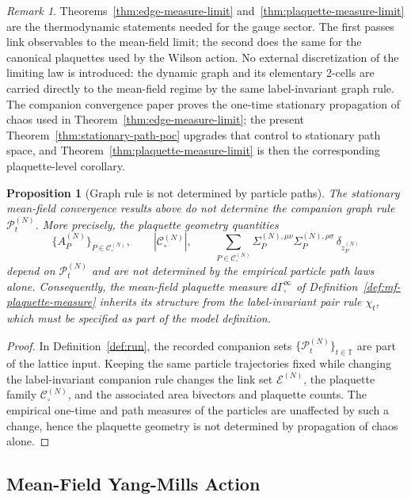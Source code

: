 \documentclass[11pt]{article}
\newtheorem{proposition}[theorem]{Proposition}
\theoremstyle{remark}
\newtheorem{remark}[theorem]{Remark}
\newcommand{\Tset}{\mathbb T}
\newcommand{\mcE}{\mathcal E}
\begin{document}
\begin{remark}
Theorems~\ref{thm:edge-measure-limit} and~\ref{thm:plaquette-measure-limit}
are the thermodynamic statements needed for the gauge sector.
The first passes link observables to the mean-field limit; the second does the
same for the canonical plaquettes used by the Wilson action.
No external discretization of the limiting law is introduced: the dynamic graph
and its elementary 2-cells are carried directly to the mean-field regime by the
same label-invariant graph rule.
The companion convergence paper proves the one-time stationary propagation of
chaos used in Theorem~\ref{thm:edge-measure-limit}; the present
Theorem~\ref{thm:stationary-path-poc} upgrades that control to stationary path
space, and Theorem~\ref{thm:plaquette-measure-limit} is then the corresponding
plaquette-level corollary.
\end{remark}

\begin{proposition}[Graph rule is not determined by particle paths]
\label{prop:refinement-additional}
The stationary mean-field convergence results above do not determine the companion
graph rule $\mathcal P_t^{(N)}$.
More precisely, the plaquette geometry quantities
\[
\{A_P^{(N)}\}_{P\in\mathcal C_\square^{(N)}},\qquad
|\mathcal C_\square^{(N)}|,
\qquad
\sum_{P\in\mathcal C_\square^{(N)}}
\Sigma_P^{(N),\mu\nu}\Sigma_P^{(N),\rho\sigma}\,\delta_{z_P^{(N)}}
\]
depend on $\mathcal P_t^{(N)}$ and are not determined by the empirical particle
path laws alone.
Consequently, the mean-field plaquette measure $d\Gamma_\square^\infty$ of
Definition~\ref{def:mf-plaquette-measure} inherits its structure from the
label-invariant pair rule $\chi_t$, which must be specified as part of the
model definition.
\end{proposition}
\begin{proof}
In Definition~\ref{def:run}, the recorded companion sets
$\{\mathcal P_t^{(N)}\}_{t\in\Tset}$ are part of the lattice input.
Keeping the same particle trajectories fixed while changing the label-invariant
companion rule changes the link set $\mcE^{(N)}$, the plaquette family
$\mathcal C_\square^{(N)}$, and the associated area bivectors and plaquette counts.
The empirical one-time and path measures of the particles are unaffected by such
a change, hence the plaquette geometry is not determined by propagation of chaos alone.
\end{proof}

\subsection{Mean-Field Yang-Mills Action}
\label{sec:mf-ym}
\end{document}
